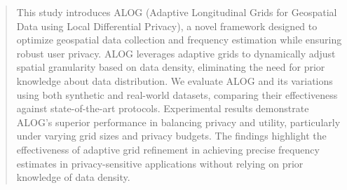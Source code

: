 \documentclass[sigconf]{acmart}
\begin{document}
\begin{abstract}
  This study introduces ALOG (Adaptive Longitudinal Grids for Geospatial Data using Local Differential Privacy), a novel framework designed to optimize geospatial data collection and frequency estimation while ensuring robust user privacy. ALOG leverages adaptive grids to dynamically adjust spatial granularity based on data density, eliminating the need for prior knowledge about data distribution. We evaluate ALOG and its variations using both synthetic and real-world datasets, comparing their effectiveness against state-of-the-art protocols. Experimental results demonstrate ALOG's superior performance in balancing privacy and utility, particularly under varying grid sizes and privacy budgets. The findings highlight the effectiveness of adaptive grid refinement in achieving precise frequency estimates in privacy-sensitive applications without relying on prior knowledge of data density. 
\end{abstract}


\maketitle













\end{document}
